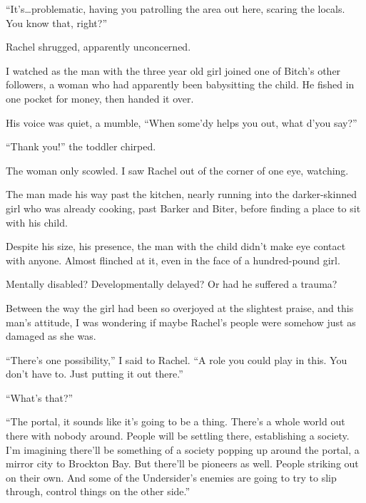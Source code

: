 ``It's\ldots problematic, having you patrolling the area out here, scaring the locals.  You know that, right?''



Rachel shrugged, apparently unconcerned.



I watched as the man with the three year old girl joined one of Bitch's other followers, a woman who had apparently been babysitting the child.  He fished in one pocket for money, then handed it over.



His voice was quiet, a mumble, ``When some'dy helps you out, what d'you say?''



``Thank you!'' the toddler chirped.



The woman only scowled.  I saw Rachel out of the corner of one eye, watching.



The man made his way past the kitchen, nearly running into the darker-skinned girl who was already cooking, past Barker and Biter, before finding a place to sit with his child.



Despite his size, his presence, the man with the child didn't make eye contact with anyone.  Almost flinched at it, even in the face of a hundred-pound girl.



Mentally disabled?  Developmentally delayed?  Or had he suffered a trauma?



Between the way the girl had been so overjoyed at the slightest praise, and this man's attitude, I was wondering if maybe Rachel's people were somehow just as damaged as she was.



``There's one possibility,'' I said to Rachel.  ``A role you could play in this.  You don't have to.  Just putting it out there.''



``What's that?''



``The portal, it sounds like it's going to be a thing.  There's a whole world out there with nobody around.  People will be settling there, establishing a society.  I'm imagining there'll be something of a society popping up around the portal, a mirror city to Brockton Bay.  But there'll be pioneers as well.  People striking out on their own.  And some of the Undersider's enemies are going to try to slip through, control things on the other side.''



